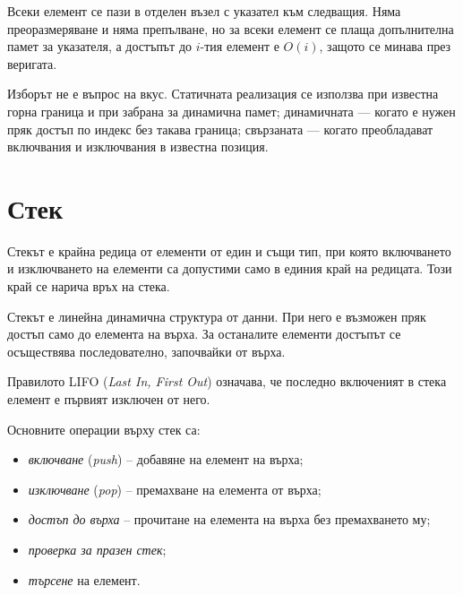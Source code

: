 \begin{defn}
Всеки елемент се пази в отделен възел с указател към следващия. Няма
преоразмеряване и няма препълване, но за всеки елемент се плаща допълнителна
памет за указателя, а достъпът до $i$-тия елемент е $O(i)$, защото се минава
през веригата.
\end{defn}

\begin{remark}
Изборът не е въпрос на вкус. Статичната реализация се използва при известна
горна граница и при забрана за динамична памет; динамичната --- когато е нужен
пряк достъп по индекс без такава граница; свързаната --- когато преобладават
включвания и изключвания в известна позиция.
\end{remark}

\section{Стек}\label{s:18.3}

\begin{defn}[Стек]
Стекът е крайна редица от елементи от един и същи тип, при която включването и изключването на елементи са допустими само в единия край на редицата. Този край се нарича връх на стека.
\end{defn}

Стекът е линейна динамична структура от данни. При него е възможен пряк достъп само до елемента на върха. За останалите елементи достъпът се осъществява последователно, започвайки от върха.

\begin{keydefn}[LIFO]
Правилото LIFO (\emph{Last In, First Out}) означава, че последно включеният в стека елемент е първият изключен от него.
\end{keydefn}

Основните операции върху стек са:

\begin{itemize}
    \item \emph{включване} (\emph{push}) -- добавяне на елемент на върха;
    \item \emph{изключване} (\emph{pop}) -- премахване на елемента от върха;
    \item \emph{достъп до върха} -- прочитане на елемента на върха без премахването му;
    \item \emph{проверка за празен стек};
    \item \emph{търсене} на елемент.
\end{itemize}

